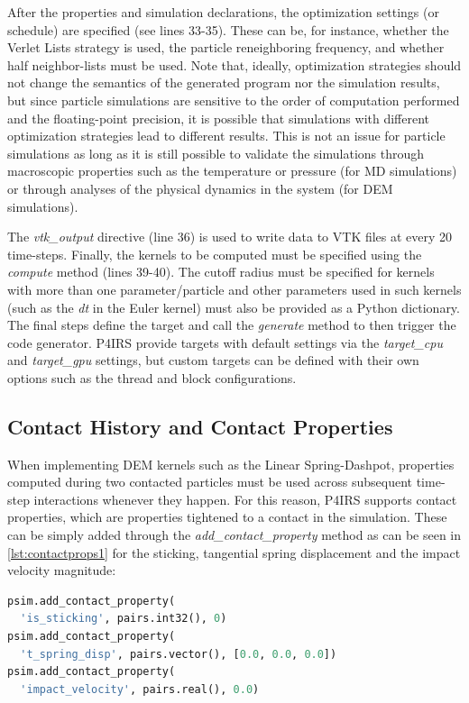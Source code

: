 \documentclass[Afour,sageh,times]{sagej}
\begin{document}
After the properties and simulation declarations, the optimization settings (or schedule) are specified (see lines 33-35).
These can be, for instance, whether the Verlet Lists strategy is used, the particle reneighboring frequency, and whether half neighbor-lists must be used.
Note that, ideally, optimization strategies should not change the semantics of the generated program nor the simulation results, but since particle simulations are sensitive to the order of computation performed and the floating-point precision, it is possible that simulations with different optimization strategies lead to different results.
This is not an issue for particle simulations as long as it is still possible to validate the simulations through macroscopic properties such as the temperature or pressure (for \ac{MD} simulations) or through analyses of the physical dynamics in the system (for \ac{DEM} simulations).

The \emph{vtk\_output} directive (line 36) is used to write data to VTK files at every 20 time-steps.
Finally, the kernels to be computed must be specified using the \emph{compute} method (lines 39-40).
The cutoff radius must be specified for kernels with more than one parameter/particle and other parameters used in such kernels (such as the \emph{dt} in the Euler kernel) must also be provided as a Python dictionary.
The final steps define the target and call the \emph{generate} method to then trigger the code generator.
P4IRS provide targets with default settings via the \emph{target\_cpu} and \emph{target\_gpu} settings, but custom targets can be defined with their own options such as the thread and block configurations.

\subsection{Contact History and Contact Properties}
\label{sec:contact_history}

When implementing DEM kernels such as the Linear Spring-Dashpot, properties computed during two contacted particles must be used across subsequent time-step interactions whenever they happen.
For this reason, P4IRS supports contact properties, which are properties tightened to a contact in the simulation.
These can be simply added through the \emph{add\_contact\_property} method as can be seen in \autoref{lst:contactprops1} for the sticking, tangential spring displacement and the impact velocity magnitude:

\begin{lstlisting}[language=Python,
		   label={lst:contactprops1},
		   caption={Contact properties setup example.}]
psim.add_contact_property(
  'is_sticking', pairs.int32(), 0)
psim.add_contact_property(
  't_spring_disp', pairs.vector(), [0.0, 0.0, 0.0])
psim.add_contact_property(
  'impact_velocity', pairs.real(), 0.0)
\end{lstlisting}
\end{document}
